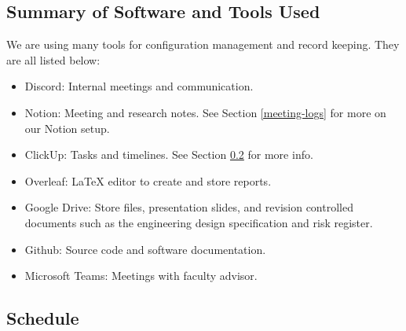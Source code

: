 \documentclass[a4paper,11pt]{article}
\begin{document}
\subsection{Summary of Software and Tools Used}
We are using many tools for configuration management and record keeping. They are all listed below:

\begin{itemize}
    \item Discord: Internal meetings and communication.
    \item Notion: Meeting and research notes. See Section \ref{meeting-logs} for more on our Notion setup.
    \item ClickUp: Tasks and timelines. See Section \ref{schedule} for more info.
    \item Overleaf: LaTeX editor to create and store reports.
    \item Google Drive: Store files, presentation slides, and revision controlled documents such as the engineering design specification and risk register.
    \item Github: Source code and software documentation.
    \item Microsoft Teams: Meetings with faculty advisor.
\end{itemize}

\subsection{Schedule}
\label{schedule}
\end{document}

